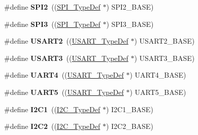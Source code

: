 \begin{DoxyCompactItemize}
\#define {\bfseries S\+P\+I2}~((\mbox{\hyperlink{struct_s_p_i___type_def}{S\+P\+I\+\_\+\+Type\+Def}} $\ast$) S\+P\+I2\+\_\+\+B\+A\+SE)
\item 
\mbox{\label{group___peripheral__declaration_gab2339cbf25502bf562b19208b1b257fc}} 
\#define {\bfseries S\+P\+I3}~((\mbox{\hyperlink{struct_s_p_i___type_def}{S\+P\+I\+\_\+\+Type\+Def}} $\ast$) S\+P\+I3\+\_\+\+B\+A\+SE)
\item 
\mbox{\label{group___peripheral__declaration_gaf114a9eab03ca08a6fb720e511595930}} 
\#define {\bfseries U\+S\+A\+R\+T2}~((\mbox{\hyperlink{struct_u_s_a_r_t___type_def}{U\+S\+A\+R\+T\+\_\+\+Type\+Def}} $\ast$) U\+S\+A\+R\+T2\+\_\+\+B\+A\+SE)
\item 
\mbox{\label{group___peripheral__declaration_ga2350115553c1fe0a7bc14e6a7ec6a225}} 
\#define {\bfseries U\+S\+A\+R\+T3}~((\mbox{\hyperlink{struct_u_s_a_r_t___type_def}{U\+S\+A\+R\+T\+\_\+\+Type\+Def}} $\ast$) U\+S\+A\+R\+T3\+\_\+\+B\+A\+SE)
\item 
\mbox{\label{group___peripheral__declaration_ga7c035f6f443c999fc043b2b7fb598800}} 
\#define {\bfseries U\+A\+R\+T4}~((\mbox{\hyperlink{struct_u_s_a_r_t___type_def}{U\+S\+A\+R\+T\+\_\+\+Type\+Def}} $\ast$) U\+A\+R\+T4\+\_\+\+B\+A\+SE)
\item 
\mbox{\label{group___peripheral__declaration_ga9274e37cf5e8a174fc5dd627b98ec0fe}} 
\#define {\bfseries U\+A\+R\+T5}~((\mbox{\hyperlink{struct_u_s_a_r_t___type_def}{U\+S\+A\+R\+T\+\_\+\+Type\+Def}} $\ast$) U\+A\+R\+T5\+\_\+\+B\+A\+SE)
\item 
\mbox{\label{group___peripheral__declaration_gab45d257574da6fe1f091cc45b7eda6cc}} 
\#define {\bfseries I2\+C1}~((\mbox{\hyperlink{struct_i2_c___type_def}{I2\+C\+\_\+\+Type\+Def}} $\ast$) I2\+C1\+\_\+\+B\+A\+SE)
\item 
\mbox{\label{group___peripheral__declaration_gafa60ac20c1921ef1002083bb3e1f5d16}} 
\#define {\bfseries I2\+C2}~((\mbox{\hyperlink{struct_i2_c___type_def}{I2\+C\+\_\+\+Type\+Def}} $\ast$) I2\+C2\+\_\+\+B\+A\+SE)

\end{DoxyCompactItemize}
